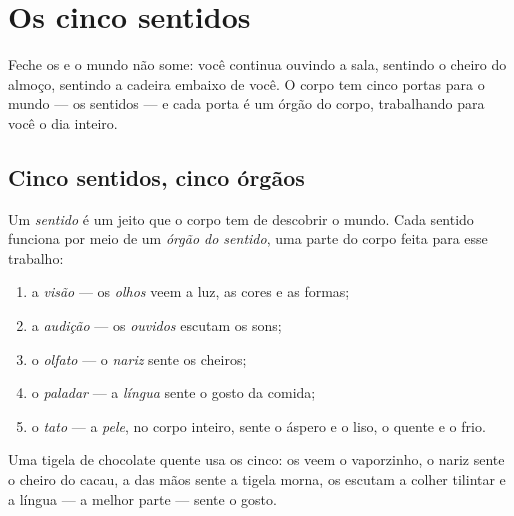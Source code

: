 \chapter{Os cinco sentidos}\label{ch:g1:the-five-senses}

Feche os  e o mundo não some: você continua ouvindo a sala,
sentindo o cheiro do almoço, sentindo a cadeira embaixo de você. O
corpo tem cinco portas para o mundo --- os sentidos --- e cada porta
é um órgão do corpo, trabalhando para você o dia inteiro.

\section{Cinco sentidos, cinco órgãos}

\begin{definition}\label{def:g1:the-five-senses:sense}
Um \emph{sentido} é um jeito que o corpo tem de
descobrir o mundo. Cada sentido funciona por meio de um \emph{órgão
do sentido}, uma parte do corpo feita para
esse trabalho:
\begin{enumerate}
  \item a \emph{visão} --- os \emph{olhos}
        veem a luz, as cores e as formas;
  \item a \emph{audição} --- os
        \emph{ouvidos} escutam os sons;
  \item o \emph{olfato} --- o \emph{nariz}
        sente os cheiros;
  \item o \emph{paladar} --- a
        \emph{língua} sente o gosto da comida;
  \item o \emph{tato} --- a \emph{pele},
        no corpo inteiro, sente o áspero e o liso, o quente e o frio.
\end{enumerate}
\end{definition}

\begin{example}\label{ex:g1:the-five-senses:breakfast}
Uma tigela de chocolate quente usa os cinco: os  veem o
vaporzinho, o nariz sente o cheiro do cacau, a  das mãos sente a
tigela morna, os  escutam a colher tilintar e a língua --- a
melhor parte --- sente o gosto.
\end{example}

